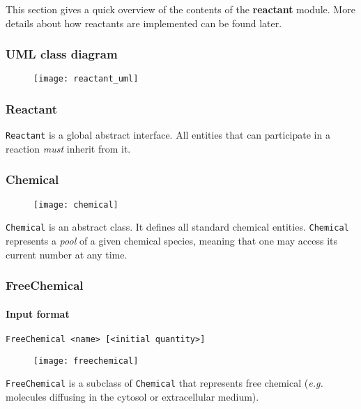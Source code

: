 This section gives a quick overview of the contents of the \textbf{reactant} module. More details about how reactants are implemented can be found later.

\subsubsection{UML class diagram}

\begin{figure}[!ht]
	\centering
	\texttt{[image: reactant\_uml]}
\end{figure}

\subsubsection{Reactant}

\texttt{Reactant} is a global abstract interface. All entities that can participate in a reaction \emph{must} inherit from it.

\subsubsection{Chemical}

\begin{figure}[!ht]
	\centering
	\texttt{[image: chemical]}
\end{figure}

\texttt{Chemical} is an abstract class. It defines all standard chemical entities. \texttt{Chemical} represents a \emph{pool} of a given chemical species, meaning that one may access its current number at any time.

\subsubsection{FreeChemical}

\paragraph{Input format}
\begin{verbatim}
FreeChemical <name> [<initial quantity>]
\end{verbatim}

\begin{figure}[!ht]
	\centering
	\texttt{[image: freechemical]}
\end{figure}

\texttt{FreeChemical} is a subclass of \texttt{Chemical} that represents free chemical (\textit{e.g.} molecules diffusing in the cytosol or extracellular medium).

